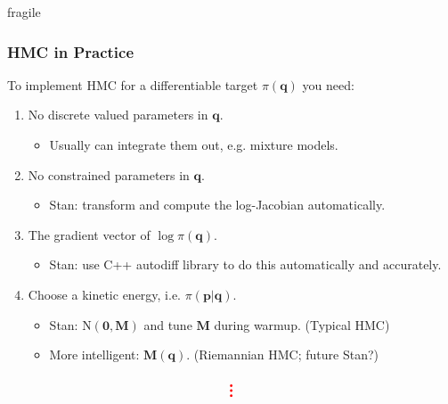 \documentclass[xcolor=dvipsnames]{beamer}
\begin{document}
\begin{frame}{fragile}
\frametitle{HMC in Practice}
To implement HMC for a differentiable target $\pi(\bm{q})$ you need:
\vspace{0.2cm}
\begin{enumerate}
\item No discrete valued parameters in $\bm{q}$.  
\begin{itemize}
\item Usually can integrate them out, e.g. mixture models.
\end{itemize}
\vspace{0.2cm}
\item No constrained parameters in $\bm{q}$. 
\begin{itemize}
\item Stan: transform and compute the log-Jacobian automatically.
\end{itemize}
\vspace{0.2cm}
\item The gradient vector of $\log \pi(\bm{q})$.
\begin{itemize}
\item Stan: use C++ autodiff library to do this automatically and accurately.
\end{itemize}
\vspace{0.2cm}
\item Choose a kinetic energy, i.e. $\pi(\bm{p}|\bm{q})$.
\begin{itemize}
\item Stan: $\mathrm{N}(\bm{0}, \bm{M})$ and tune $\bm{M}$ during warmup. (Typical HMC)
\item More intelligent: $\bm{M}(\bm{q})$. (Riemannian HMC; future Stan?)
\end{itemize}
\end{enumerate}
\begin{align*}
{\color{red}\Huge{\vdots}}
\end{align*}
\end{frame}
\end{document}
